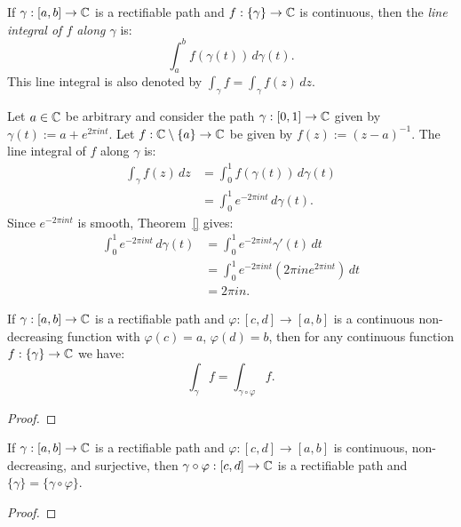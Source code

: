 \documentclass[reqno]{amsart}
\begin{document}
\begin{definition}
	If $\gamma:[a,b] \rightarrow \mathbb{C}$ is a rectifiable path and $f:\{\gamma\} \rightarrow \mathbb{C}$ is continuous, then the \emph{line integral of $f$ along $\gamma$} is:
	\[
		\int_{a}^{b} f(\gamma(t))\,d\gamma(t).	
	\]
	This line integral is also denoted by $\int_{\gamma}^{} f = \int_{\gamma}^{} f(z)\,dz$.
\end{definition}

\begin{example}
	Let $a \in \mathbb{C}$ be arbitrary and consider the path $\gamma:[0,1] \rightarrow \mathbb{C}$ given by $\gamma(t) := a + e^{2\pi i n t}$. Let $f:\mathbb{C} \setminus \{a\} \rightarrow \mathbb{C}$ be given by $f(z) := (z-a)^{-1}$. The line integral of $f$ along $\gamma$ is:
	\begin{align*}
		\int_{\gamma}^{} f(z)\,dz
		&= \int_{0}^{1} f(\gamma(t))\,d\gamma(t) \\
		&= \int_{0}^{1} e^{-2\pi i n t}\,d\gamma(t).
	\end{align*}
	Since $e^{-2\pi i n t}$ is smooth, Theorem~\ref{} gives:
	\begin{align*}
		\int_{0}^{1} e^{-2 \pi i n t}\,d\gamma(t)
		&= \int_{0}^{1} e^{-2 \pi i n t} \gamma'(t)\,dt \\
		&= \int_{0}^{1} e^{-2 \pi i n t} \left( 2\pi i n e^{2 \pi i  n t} \right)\,dt  \\
		&= 2\pi i n.
	\end{align*}
\end{example}

\begin{proposition}
	If $\gamma:[a,b] \rightarrow \mathbb{C}$ is a rectifiable path and $\varphi:[c,d] \rightarrow [a,b]$ is a continuous non-decreasing function with $\varphi(c) = a$, $\varphi(d) = b$, then for any continuous function $f: \{\gamma\} \rightarrow \mathbb{C}$ we have:
	\[
		\int_{\gamma}^{} f = \int_{\gamma \circ \varphi}^{} f.
	\] 
\end{proposition}
{\color{red}
\begin{proof}
		
\end{proof}}

\begin{lemma}
	If $\gamma:[a,b] \rightarrow \mathbb{C}$ is a rectifiable path and $\varphi:[c,d] \rightarrow [a,b]$ is continuous, non-decreasing, and surjective, then $\gamma \circ \varphi : [c,d] \rightarrow \mathbb{C}$ is a rectifiable path and $\{\gamma\} = \{\gamma \circ \varphi\}$.
\end{lemma}
{\color{red}
\begin{proof}
		
\end{proof}}
\end{document}
